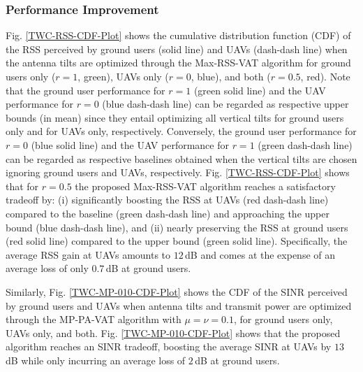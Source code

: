 \subsubsection{Performance Improvement}\label{Resulting-performance-improvement}



Fig. \ref{TWC-RSS-CDF-Plot} shows the cumulative distribution function (CDF) of the RSS perceived by ground users (solid line) and UAVs (dash-dash line) when the antenna tilts are optimized through the Max-RSS-VAT algorithm for ground users only ($r = 1$, green), UAVs only ($r = 0$, blue), and both ($r= 0.5$, red). Note that the ground user performance for $r = 1$ (green solid line) and the UAV performance for $r = 0$ (blue dash-dash line) can be regarded as respective upper bounds (in mean) since they entail optimizing all vertical tilts for ground users only and for UAVs only, respectively. Conversely, the ground user performance for $r = 0$ (blue solid line) and the UAV performance for $r = 1$ (green dash-dash line) can be regarded as respective baselines obtained when the vertical tilts are chosen ignoring ground users and UAVs, respectively. Fig. \ref{TWC-RSS-CDF-Plot} shows that for $r = 0.5$ the proposed Max-RSS-VAT algorithm reaches a satisfactory tradeoff by: (i) significantly boosting the RSS at UAVs (red dash-dash line) compared to the baseline (green dash-dash line) and approaching the upper bound (blue dash-dash line), and (ii) nearly preserving the RSS at ground users (red solid line) compared to the upper bound (green solid line). Specifically, the average RSS gain at UAVs amounts to $12$\,dB and comes at the expense of an average loss of only $0.7$\,dB at ground users.

Similarly, Fig. \ref{TWC-MP-010-CDF-Plot} shows the CDF of the SINR perceived by ground users and UAVs when antenna tilts and transmit power are optimized through the MP-PA-VAT algorithm with $\mu =\nu = 0.1$, for ground users only, UAVs only, and both. Fig. \ref{TWC-MP-010-CDF-Plot} shows that the proposed algorithm reaches an SINR tradeoff, boosting the average SINR at UAVs by $13$\,dB while only incurring an average loss of $2$\,dB at ground users. 





